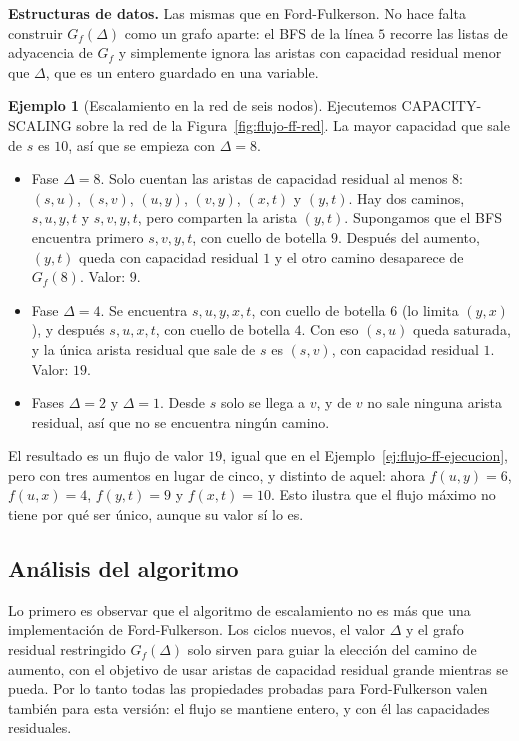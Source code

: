 \documentclass[12pt, spanish, oneside, openany]{book}
\newenvironment{estructuras}%
  {\begin{center}\begin{minipage}{0.93\textwidth}\begin{mdframed}[style=estrbox]%
   \small\textbf{Estructuras de datos.}\;}%
  {\end{mdframed}\end{minipage}\end{center}}
\newcommand{\alg}[1]{#1}
\theoremstyle{uprightplain}
\theoremstyle{definition}
\newtheorem{ejemplo}[teorema]{Ejemplo}
\theoremstyle{remark}
\theoremstyle{definition}
\begin{document}
\begin{estructuras}
Las mismas que en Ford-Fulkerson. No hace falta construir $G_f(\Delta)$ como un
grafo aparte: el BFS de la línea $5$ recorre las listas de adyacencia de $G_f$ y
simplemente ignora las aristas con capacidad residual menor que $\Delta$, que
es un entero guardado en una variable.
\end{estructuras}

\begin{ejemplo}[Escalamiento en la red de seis nodos]
\label{ej:flujo-escalamiento}
Ejecutemos \alg{CAPACITY-SCALING} sobre la red de la Figura~\ref{fig:flujo-ff-red}. La mayor capacidad que sale de $s$ es $10$, así que se empieza con $\Delta=8$.
\begin{itemize}
    \item Fase $\Delta=8$. Solo cuentan las aristas de capacidad residual al menos $8$: $(s,u)$, $(s,v)$, $(u,y)$, $(v,y)$, $(x,t)$ y $(y,t)$. Hay dos caminos, $s,u,y,t$ y $s,v,y,t$, pero comparten la arista $(y,t)$. Supongamos que el BFS encuentra primero $s,v,y,t$, con cuello de botella $9$. Después del aumento, $(y,t)$ queda con capacidad residual $1$ y el otro camino desaparece de $G_f(8)$. Valor: $9$.
    \item Fase $\Delta=4$. Se encuentra $s,u,y,x,t$, con cuello de botella $6$ (lo limita $(y,x)$), y después $s,u,x,t$, con cuello de botella $4$. Con eso $(s,u)$ queda saturada, y la única arista residual que sale de $s$ es $(s,v)$, con capacidad residual $1$. Valor: $19$.
    \item Fases $\Delta=2$ y $\Delta=1$. Desde $s$ solo se llega a $v$, y de $v$ no sale ninguna arista residual, así que no se encuentra ningún camino.
\end{itemize}
El resultado es un flujo de valor $19$, igual que en el Ejemplo~\ref{ej:flujo-ff-ejecucion}, pero con tres aumentos en lugar de cinco, y distinto de aquel: ahora $f(u,y)=6$, $f(u,x)=4$, $f(y,t)=9$ y $f(x,t)=10$. Esto ilustra que el flujo máximo no tiene por qué ser único, aunque su valor sí lo es.
\end{ejemplo}

\subsection{Análisis del algoritmo}

Lo primero es observar que el algoritmo de escalamiento no es más que una implementación de Ford-Fulkerson. Los ciclos nuevos, el valor $\Delta$ y el grafo residual restringido $G_f(\Delta)$ solo sirven para guiar la elección del camino de aumento, con el objetivo de usar aristas de capacidad residual grande mientras se pueda. Por lo tanto todas las propiedades probadas para Ford-Fulkerson valen también para esta versión: el flujo se mantiene entero, y con él las capacidades residuales.
\end{document}

